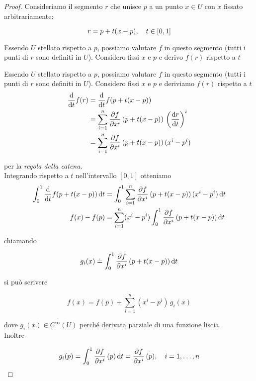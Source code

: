 \begin{proof}
	Consideriamo il segmento $ r $ che  unisce $ p $ a un punto $ x \in U $ con $ x $ fissato  arbitrariamente:
	
	\begin{equation}
		r=p+t(x-p) \qcomma t \in [0,1]
	\end{equation}
	
	Essendo $ U $ stellato rispetto a $ p $, possiamo valutare $ f $ in questo segmento (tutti i punti di $ r $ sono definiti in $ U $). Considero fissi $ x $ e $ p $ e derivo $ f(r) $ rispetto a $ t $
	
	Essendo $ U $ stellato rispetto a $ p $, possiamo valutare $ f $ in questo segmento (tutti i punti di $ r $ sono definiti in $ U $). Considero fissi $ x $ e $ p $ e deriviamo $ f(r) $ rispetto a $ t $
	\begin{align}
		\begin{split}
			\dv{t} f(r) &= \dv{t} f(p+t(x-p)) \\
			&= \sum_{i=1}^{n} \pdv{f}{x^{i}} \, (p+t(x-p)) \, \left( \dv{r}{t} \right)^{i} \\
			&= \sum_{i=1}^{n} \pdv{f}{x^{i}} \, (p+t(x-p)) \, (x^{i}-p^{i})
		\end{split}
	\end{align}
	
	per la \textit{regola della catena}. \\
	Integrando rispetto a $ t $ nell'intervallo $ [0,1] $ otteniamo
	\begin{align}
		\begin{split}
			\int_{0}^{1} \dv{t} f(p+t(x-p)) \dd{t} &= \int_{0}^{1} \sum_{i=1}^{n} \pdv{f}{x^{i}} \, (p+t(x-p)) \, (x^{i}-p^{i}) \dd{t} \\
			f(x) - f(p) &= \sum_{i=1}^{n} (x^{i}-p^{i}) \int_{0}^{1} \pdv{f}{x^{i}} \, (p+t(x-p)) \dd{t}
		\end{split}
	\end{align}
	
	chiamando
	
	\begin{equation}
		g_{i}(x) \doteq \int_{0}^{1} \pdv{f}{x^{i}} \, (p+t(x-p)) \dd{t}
	\end{equation}
	
	si può scrivere
	
	\begin{equation}
		f(x)= f(p) + \sum_{i=1}^{n} (x^{i}-p^{i}) \, g_{i}(x)
	\end{equation}
	
	dove $ g_{i}(x) \in C^{\infty}(U) $ perché derivata parziale di una funzione liscia. \\
	Inoltre
	
	\begin{equation}
		g_{i}(p) = \int_{0}^{1} \pdv{f}{x^{i}} \, (p) \dd{t} = \pdv{f}{x^{i}} \, (p) \qcomma i=1,\dots,n
	\end{equation}
\end{proof}

